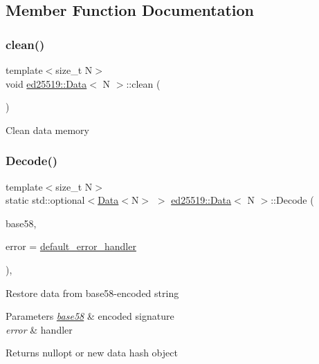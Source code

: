 \subsection{Member Function Documentation}
\mbox{\label{classed25519_1_1_data_a65d5eba2b3c68f68001ef4d32645f9d9}} 
\subsubsection{\texorpdfstring{clean()}{clean()}}
{\footnotesize\ttfamily template$<$size\+\_\+t N$>$ \\
void \mbox{\hyperlink{classed25519_1_1_data}{ed25519\+::\+Data}}$<$ N $>$\+::clean (\begin{DoxyParamCaption}{ }\end{DoxyParamCaption})\hspace{0.3cm}{\ttfamily [inline]}}

Clean data memory \mbox{\label{classed25519_1_1_data_a289015b1f2c8c57fed156d0f18059968}} 
\subsubsection{\texorpdfstring{Decode()}{Decode()}}
{\footnotesize\ttfamily template$<$size\+\_\+t N$>$ \\
static std\+::optional$<$\mbox{\hyperlink{classed25519_1_1_data}{Data}}$<$N$>$ $>$ \mbox{\hyperlink{classed25519_1_1_data}{ed25519\+::\+Data}}$<$ N $>$\+::Decode (\begin{DoxyParamCaption}\item[{const std\+::string \&}]{base58,  }\item[{const \mbox{\hyperlink{namespaceed25519_a6ba572942b3c18591fc869d52a6b16e6}{Error\+Handler}} \&}]{error = {\ttfamily \mbox{\hyperlink{namespaceed25519_a7c7bb6ed17541162959c33ed3e3b15fb}{default\+\_\+error\+\_\+handler}}} }\end{DoxyParamCaption})\hspace{0.3cm}{\ttfamily [inline]}, {\ttfamily [static]}}

Restore data from base58-\/encoded string 
\begin{DoxyParams}{Parameters}
{\em \mbox{\hyperlink{namespaceed25519_1_1base58}{base58}}} & encoded signature \\
\hline
{\em error} & handler \\
\hline
\end{DoxyParams}
\begin{DoxyReturn}{Returns}
nullopt or new data hash object 
\end{DoxyReturn}
\mbox{\label{classed25519_1_1_data_a281d932d3c3fe7fd40ce86ea7eff559b}} 
